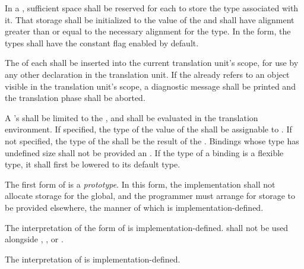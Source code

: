 \specsubsubitem
In a , sufficient space shall be reserved for
each  to store the type associated with it. That
storage shall be initialized to the value of the  and
shall have alignment greater than or equal to the necessary alignment for the
type. In the  form, the types shall have the constant flag
enabled by default.

\specsubsubitem
The  of each  shall be
inserted into the current translation unit's scope, for use by any other
declaration in the translation unit. If the  already
refers to an object visible in the translation unit's scope, a diagnostic
message shall be printed and the translation phase shall be aborted.

\specsubsubitem
A 's  shall be limited to
the , and shall be evaluated
in the translation environment. If specified, the type of the value of the
 shall be assignable to . If not
specified, the type of the  shall be the result
of the . Bindings whose type has undefined size shall
not be provided an . If the type of a binding is a
flexible type, it shall first be lowered to its default type.

\specsubsubitem
The first form of  is a \textit{prototype}. In this
form, the implementation shall not allocate storage for the global, and the
programmer must arrange for storage to be provided elsewhere, the manner of
which is implementation-defined.

\specsubsubitem
The interpretation of the  form of  is
implementation-defined.  shall not be used alongside
, , or .


\specsubsubitem
The interpretation of  is implementation-defined.



